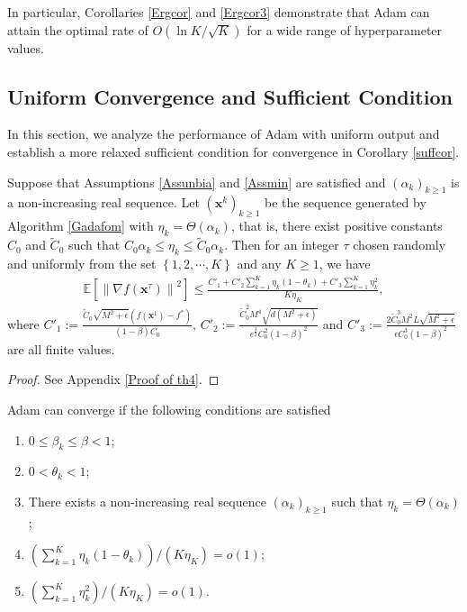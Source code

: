 \documentclass[twoside,11pt]{article}
\begin{document}
\par In particular, Corollaries \ref{Ergcor} and  \ref{Ergcor3} demonstrate that Adam can attain the optimal rate of $O(\ln K/\sqrt{K})$ for a wide range of hyperparameter values.

\subsection{Uniform Convergence and Sufficient Condition}\label{Uniform Output and Sufficient Condition}
In this section, we analyze the performance of Adam with uniform output and establish a more relaxed sufficient condition for convergence in Corollary \ref{suffcor}.

\begin{theorem}\label{th4}
Suppose that Assumptions \ref{Assunbia} and \ref{Assmin} are satisfied and $(\alpha_k)_{k\ge 1}$ is a non-increasing real sequence. Let $(\mathbf{x}^k)_{k\ge 1}$ be the sequence generated by Algorithm \ref{Gadafom} with $\eta_k=\Theta(\alpha_{k})$, that is, there exist  positive constants $C_0$ and $\tilde{C}_0$ such that $C_0\alpha_k\le \eta_{k}\le \tilde{C}_0 \alpha_k$. Then for an integer $\tau$ chosen randomly and uniformly from the set $\left\lbrace 1,2,\cdots,K\right\rbrace $ and any $K\ge 1$, we have
\begin{equation}\label{th4.1}
\begin{aligned}
	\mathbb{E}\left[\left\| \nabla f(\mathbf{x}^{\tau})\right\|^2\right]
	\le\frac{ C'_1
		+C'_2\sum_{k=1}^{K}\eta_k{(1-\theta_k)}+C'_3 \sum_{k=1}^{K}\eta_{k}^2}{K\eta_{K}},\nonumber
\end{aligned}
\end{equation}
where  $C'_1:=\frac{\tilde{C}_0\sqrt{M^2+\epsilon}\left( f(\mathbf{x}^1)-f^*\right) }{(1-\beta)C_0}$, $
C'_2:=\frac{\tilde{C}_0^2 M^4\sqrt{d(M^2+\epsilon)}}{\epsilon^{\frac{3}{2}}C_0^2(1-\beta)^2}$ and $
C'_3:=\frac{2\tilde{C}_0^3 M^2L\sqrt{M^2+\epsilon}}{\epsilon C_0^3(1-\beta)^2}$ are all finite values.
\end{theorem}
\begin{proof}
See Appendix \ref{Proof of th4}.
\end{proof}	
\begin{corollary}[SC-Adam]\label{suffcor}
Adam can converge if the following conditions are satisfied
\begin{enumerate}
\item $0\le\beta_k\le\beta<1$;
\item $0<\theta_k<1$;
\item There exists a non-increasing real sequence $(\alpha_k)_{k\ge 1}$ such that $\eta_k=\Theta(\alpha_{k})$;
\item $\left( \sum_{k=1}^{K}\eta_k{(1-\theta_k)}\right) \big/\left( K\eta_{K}\right) =o(1)$;
\item $\left( \sum_{k=1}^{K}\eta_k^2\right) \big/\left( K\eta_{K}\right) =o(1)$.\\
\end{enumerate}
\end{corollary}
	
\end{document}
